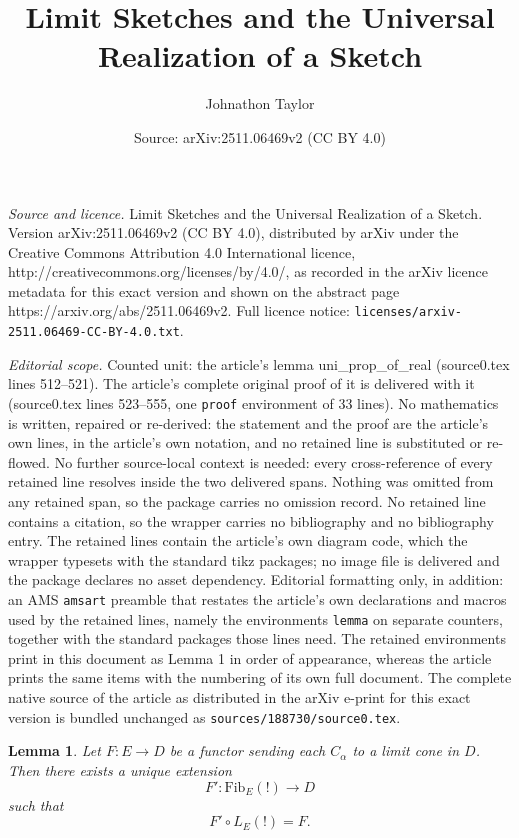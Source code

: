 \documentclass[10pt,a4paper]{amsart}
\title{Limit Sketches and the Universal Realization of a Sketch}
\author{Johnathon Taylor}
\date{Source: arXiv:2511.06469v2 (CC BY 4.0)}
\newtheorem{lemma}{Lemma}
\begin{document}
\maketitle

\noindent\emph{Source and licence.} Limit Sketches and the Universal Realization of a Sketch. Version arXiv:2511.06469v2 (CC BY 4.0), distributed by arXiv under the Creative Commons Attribution 4.0 International licence, http://creativecommons.org/licenses/by/4.0/, as recorded in the arXiv licence metadata for this exact version and shown on the abstract page https://arxiv.org/abs/2511.06469v2. Full licence notice: \texttt{licenses/arxiv-2511.06469-CC-BY-4.0.txt}.\par\smallskip

\noindent\textit{Editorial scope.} Counted unit: the article's lemma uni\_prop\_of\_real (source0.tex lines 512--521). The article's complete original proof of it is delivered with it (source0.tex lines 523--555, one \texttt{proof} environment of 33 lines). No mathematics is written, repaired or re-derived: the statement and the proof are the article's own lines, in the article's own notation, and no retained line is substituted or re-flowed.  No further source-local context is needed: every cross-reference of every retained line resolves inside the two delivered spans.  Nothing was omitted from any retained span, so the package carries no omission record.  No retained line contains a citation, so the wrapper carries no bibliography and no bibliography entry.  The retained lines contain the article's own diagram code, which the wrapper typesets with the standard tikz packages; no image file is delivered and the package declares no asset dependency.  Editorial formatting only, in addition: an AMS \texttt{amsart} preamble that restates the article's own declarations and macros used by the retained lines, namely the environments \texttt{lemma} on separate counters, together with the standard packages those lines need.  The retained environments print in this document as Lemma 1 in order of appearance, whereas the article prints the same items with the numbering of its own full document.  The complete native source of the article as distributed in the arXiv e-print for this exact version is bundled unchanged as \texttt{sources/188730/source0.tex}.
\begin{lemma}\label{uni_prop_of_real}
Let $F : E \to D$ be a functor sending each $C_\alpha$ to a limit cone in $D$. Then there exists a unique extension
\[
F' : \mathrm{Fib}_E(!) \to D
\]
such that
\[
F' \circ L_E(!) = F.
\]
\end{lemma}
\end{document}
